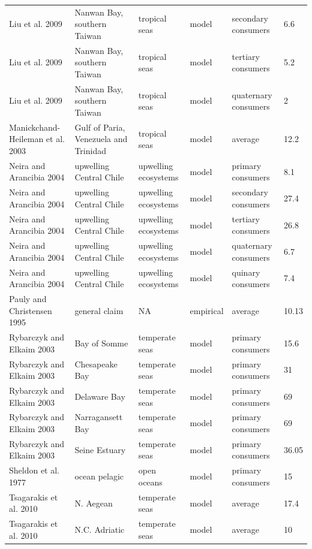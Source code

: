 \documentclass[oneside,12pt,final]{sty/ucthesis-CA2012}
\begin{document}
\begin{mainmatter}
\begin{longtable} {p{3cm}p{3cm}p{1.8cm}lp{2cm}p{1.7cm}}
    Liu et al. 2009  &  Nanwan Bay, southern Taiwan & tropical seas & model & secondary consumers & 6.6 \\
    Liu et al. 2009  & Nanwan Bay, southern Taiwan & tropical seas & model & tertiary consumers & 5.2 \\
    Liu et al. 2009   & Nanwan Bay, southern Taiwan & tropical seas & model & quaternary consumers & 2 \\
    Manickchand-Heileman et al. 2003   & Gulf of Paria, Venezuela and Trinidad & tropical seas & model & average & 12.2 \\
    Neira and Arancibia 2004   & upwelling Central Chile & upwelling ecosystems & model & primary consumers & 8.1 \\
    Neira and Arancibia 2004  & upwelling Central Chile & upwelling ecosystems & model & secondary consumers & 27.4 \\
    Neira and Arancibia 2004   & upwelling Central Chile & upwelling ecosystems & model & tertiary consumers & 26.8 \\
    Neira and Arancibia 2004   & upwelling Central Chile & upwelling ecosystems & model & quaternary consumers & 6.7 \\
    Neira and Arancibia 2004   & upwelling Central Chile & upwelling ecosystems & model & quinary consumers & 7.4 \\
    Pauly and Christensen 1995   & general claim & NA    & empirical & average & 10.13 \\
    Rybarczyk and Elkaim 2003   & Bay of Somme & temperate seas & model & primary consumers & 15.6 \\
    Rybarczyk and Elkaim 2003   & Chesapeake Bay & temperate seas & model & primary consumers & 31 \\
    Rybarczyk and Elkaim 2003  & Delaware Bay & temperate seas & model & primary consumers & 69 \\
    Rybarczyk and Elkaim 2003   & Narragansett Bay & temperate seas & model & primary consumers & 69 \\
    Rybarczyk and Elkaim 2003   & Seine Estuary & temperate seas & model & primary consumers & 36.05 \\
    Sheldon et al. 1977  &  ocean pelagic & open oceans & model & primary consumers & 15 \\
    Tsagarakis et al. 2010  & N. Aegean & temperate seas & model & average & 17.4 \\
    Tsagarakis et al. 2010  & N.C. Adriatic  & temperate seas & model & average & 10 \\

\end{longtable}
\end{mainmatter}
\end{document}
